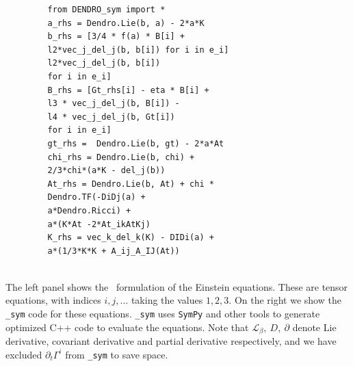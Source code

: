 \documentclass[landscape]{a0poster}
\begin{document}
\begin{textblock}{14}
\begin{figure}
\begin{minipage}[t]{.5\textwidth}
\begin{verbatim}
   from DENDRO_sym import *
   a_rhs = Dendro.Lie(b, a) - 2*a*K
   b_rhs = [3/4 * f(a) * B[i] + 
   l2*vec_j_del_j(b, b[i]) for i in e_i]
   l2*vec_j_del_j(b, b[i]) 
   for i in e_i]
   B_rhs = [Gt_rhs[i] - eta * B[i] + 
   l3 * vec_j_del_j(b, B[i]) - 
   l4 * vec_j_del_j(b, Gt[i]) 
   for i in e_i]
   gt_rhs =  Dendro.Lie(b, gt) - 2*a*At
   chi_rhs = Dendro.Lie(b, chi) + 
   2/3*chi*(a*K - del_j(b)) 
   At_rhs = Dendro.Lie(b, At) + chi *
   Dendro.TF(-DiDj(a) + 
   a*Dendro.Ricci) +
   a*(K*At -2*At_ikAtKj)
   K_rhs = vec_k_del_k(K) - DIDi(a) +
   a*(1/3*K*K + A_ij_A_IJ(At)) 
   
\end{verbatim}
\end{minipage}
\vspace{-0.15in}
\end{figure}
The left panel shows the \BSSN ~formulation of the Einstein equations. These are tensor equations, with indices $i,j,\ldots$ taking the values $1, 2, 3$. On the right we show the \texttt{{\dendro\_sym}} code for these equations. \texttt{\dendro\_sym} uses \texttt{SymPy} and other tools to generate optimized C++ code to evaluate the equations. Note that $\mathcal{L}_\beta,\ D,\ \partial$ denote Lie derivative, covariant derivative and partial derivative respectively, and we have excluded $\partial_t\Gamma^i$ from \texttt{\dendro\_sym} to save space.




\end{textblock}
\end{document}

